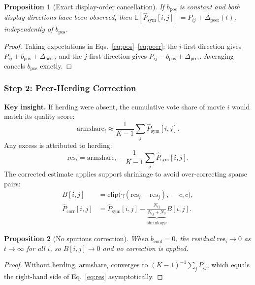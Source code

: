 \documentclass[12pt,a4paper]{article}
\newtheorem{proposition}{Proposition}
\begin{document}
\begin{proposition}[Exact display-order cancellation]\label{prop:pos}
If $b_{\mathrm{pos}}$ is constant and both display directions have been observed,
then $\mathbb{E}[\hat{P}_{\mathrm{sym}}[i,j]] = P_{ij} + \Delta_{\mathrm{peer}}(t)$,
independently of $b_{\mathrm{pos}}$.
\end{proposition}
\begin{proof}
Taking expectations in Eqs.~\eqref{eq:pos}--\eqref{eq:peer}:
the $i$-first direction gives $P_{ij} + b_{\text{pos}} + \Delta_{\text{peer}}$,
and the $j$-first direction gives $P_{ij} - b_{\text{pos}} + \Delta_{\text{peer}}$.
Averaging cancels $b_{\text{pos}}$ exactly.
\end{proof}

\subsubsection{Step 2: Peer-Herding Correction}

\textbf{Key insight.}  If herding were absent, the cumulative vote share of
movie $i$ would match its quality score:
\begin{equation}
  \text{armshare}_i \approx \frac{1}{K-1}\sum_j \hat{P}_{\text{sym}}[i,j].
\end{equation}
Any excess is attributed to herding:
\begin{equation}\label{eq:res}
  \text{res}_i = \text{armshare}_i - \frac{1}{K-1}\sum_j \hat{P}_{\text{sym}}[i,j].
\end{equation}
The corrected estimate applies support shrinkage to avoid over-correcting sparse
pairs:
\begin{align}
  B[i,j] &= \mathrm{clip}\!\bigl(\gamma(\text{res}_i - \text{res}_j),\, -c, c\bigr),\\
  \hat{P}_{\text{corr}}[i,j]
    &= \hat{P}_{\text{sym}}[i,j]
       - \underbrace{\frac{N_{ij}}{N_{ij}+N_0}}_{\text{shrinkage}} B[i,j].
       \label{eq:corr}
\end{align}

\begin{proposition}[No spurious correction]\label{prop:nospur}
When $b_{\mathrm{conf}} = 0$, the residual $\mathrm{res}_i \to 0$ as
$t \to \infty$ for all $i$, so $B[i,j] \to 0$ and no correction is applied.
\end{proposition}
\begin{proof}
Without herding, $\text{armshare}_i$ converges to $(K-1)^{-1}\sum_j P_{ij}$,
which equals the right-hand side of Eq.~\eqref{eq:res} asymptotically.
\end{proof}
\end{document}

